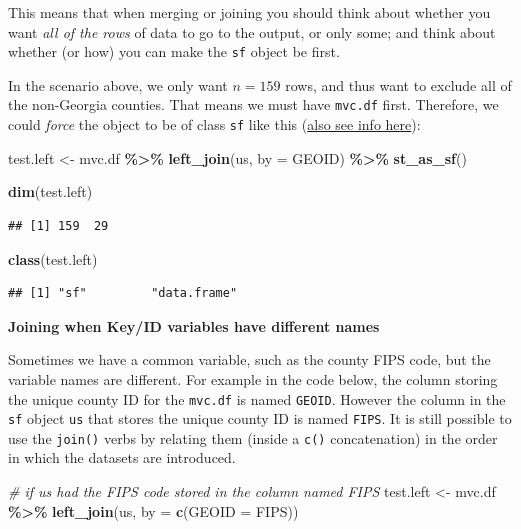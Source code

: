 \documentclass[
]{book}
\newenvironment{Shaded}{\begin{snugshade}}{\end{snugshade}}
\newcommand{\AttributeTok}[1]{\textcolor[rgb]{0.13,0.29,0.53}{#1}}
\newcommand{\CommentTok}[1]{\textcolor[rgb]{0.56,0.35,0.01}{\textit{#1}}}
\newcommand{\FunctionTok}[1]{\textcolor[rgb]{0.13,0.29,0.53}{\textbf{#1}}}
\newcommand{\NormalTok}[1]{#1}
\newcommand{\OtherTok}[1]{\textcolor[rgb]{0.56,0.35,0.01}{#1}}
\newcommand{\SpecialCharTok}[1]{\textcolor[rgb]{0.81,0.36,0.00}{\textbf{#1}}}
\newcommand{\StringTok}[1]{\textcolor[rgb]{0.31,0.60,0.02}{#1}}
\begin{document}
This means that when merging or joining you should think about whether you want \emph{all of the rows} of data to go to the output, or only some; and think about whether (or how) you can make the \texttt{sf} object be first.

In the scenario above, we only want \(n=159\) rows, and thus want to exclude all of the non-Georgia counties. That means we must have \texttt{mvc.df} first. Therefore, we could \emph{force} the object to be of class \texttt{sf} like this (\protect\hyperlink{st-as-sf}{also see info here}):

\begin{Shaded}
\begin{Highlighting}[]
\NormalTok{test.left }\OtherTok{\textless{}{-}}\NormalTok{ mvc.df }\SpecialCharTok{\%\textgreater{}\%}
  \FunctionTok{left\_join}\NormalTok{(us, }\AttributeTok{by =} \StringTok{\textquotesingle{}GEOID\textquotesingle{}}\NormalTok{) }\SpecialCharTok{\%\textgreater{}\%}
  \FunctionTok{st\_as\_sf}\NormalTok{()}

\FunctionTok{dim}\NormalTok{(test.left)}
\end{Highlighting}
\end{Shaded}

\begin{verbatim}
## [1] 159  29
\end{verbatim}

\begin{Shaded}
\begin{Highlighting}[]
\FunctionTok{class}\NormalTok{(test.left)}
\end{Highlighting}
\end{Shaded}

\begin{verbatim}
## [1] "sf"         "data.frame"
\end{verbatim}

\textbf{Joining when Key/ID variables have different names}

Sometimes we have a common variable, such as the county FIPS code, but the variable names are different. For example in the code below, the column storing the unique county ID for the \texttt{mvc.df} is named \texttt{GEOID}. However the column in the \texttt{sf} object \texttt{us} that stores the unique county ID is named \texttt{FIPS}. It is still possible to use the \texttt{join()} verbs by relating them (inside a \texttt{c()} concatenation) in the order in which the datasets are introduced.

\begin{Shaded}
\begin{Highlighting}[]
\CommentTok{\# if us had the FIPS code stored in the column named \textquotesingle{}FIPS\textquotesingle{}}
\NormalTok{test.left }\OtherTok{\textless{}{-}}\NormalTok{ mvc.df }\SpecialCharTok{\%\textgreater{}\%}
  \FunctionTok{left\_join}\NormalTok{(us, }\AttributeTok{by =} \FunctionTok{c}\NormalTok{(}\StringTok{\textquotesingle{}GEOID\textquotesingle{}} \OtherTok{=} \StringTok{\textquotesingle{}FIPS\textquotesingle{}}\NormalTok{))}
\end{Highlighting}
\end{Shaded}
\end{document}
